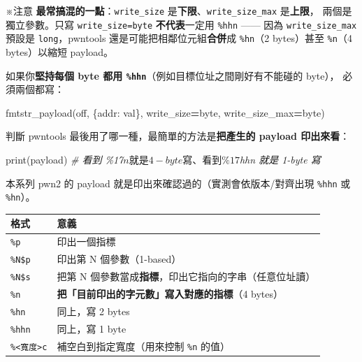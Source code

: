 \documentclass[10pt,a4paper]{article}
\newcounter{none}
\newenvironment{Shaded}{\begin{snugshade}}{\end{snugshade}}
\newcommand{\BuiltInTok}[1]{#1}
\newcommand{\CommentTok}[1]{\textcolor[rgb]{0.56,0.35,0.01}{\textit{#1}}}
\newcommand{\NormalTok}[1]{#1}
\newcommand{\OperatorTok}[1]{\textcolor[rgb]{0.81,0.36,0.00}{\textbf{#1}}}
\newcommand{\StringTok}[1]{\textcolor[rgb]{0.31,0.60,0.02}{#1}}
\renewenvironment{Shaded}{%
  \def\FrameCommand{\fboxsep=3.2pt\colorbox{shadecolor}}%
  \MakeFramed{\advance\hsize-\width\FrameRestore\small}%
}{%
  \endMakeFramed
}
\renewenvironment{quote}{%
  \begin{mdframed}[linewidth=0pt,innerleftmargin=0pt,innerrightmargin=0pt,
    innerbottommargin=0pt,innertopmargin=0pt,skipabove=0.55em,skipbelow=0.55em,
    leftmargin=0.9em,rightmargin=0.4em,startcode={\color{quotebar}\vrule width 2.6pt},%
    endcode={}]%
  \itshape\color{black}%
}{%
  \end{mdframed}%
}
\begin{document}
\begin{quote}
※注意 \textbf{最常搞混的一點}：\texttt{write\_\allowbreak{}size}
是\textbf{下限}、\texttt{write\_\allowbreak{}size\_\allowbreak{}max} 是\textbf{上限}，
兩個是獨立參數。只寫
\texttt{write\_\allowbreak{}size=\textquotesingle{}\allowbreak{}byte\textquotesingle{}\allowbreak{}}
\textbf{不代表}一定用 \texttt{\%\allowbreak{}hhn} ------ 因為
\texttt{write\_\allowbreak{}size\_\allowbreak{}max} 預設是
\texttt{\textquotesingle{}\allowbreak{}long\textquotesingle{}\allowbreak{}}，pwntools
還是可能把相鄰位元組\textbf{合併}成 \texttt{\%\allowbreak{}hn}（2 bytes）甚至
\texttt{\%\allowbreak{}n}（4 bytes）以縮短 payload。

如果你\textbf{堅持每個 byte 都用
\texttt{\%\allowbreak{}hhn}}（例如目標位址之間剛好有不能碰的 byte）， 必須兩個都寫：

\begin{Shaded}
\begin{Highlighting}[]
\NormalTok{fmtstr\_payload(off, \{addr: val\}, write\_size}\OperatorTok{=}\StringTok{\textquotesingle{}byte\textquotesingle{}}\NormalTok{, write\_size\_max}\OperatorTok{=}\StringTok{\textquotesingle{}byte\textquotesingle{}}\NormalTok{)}
\end{Highlighting}
\end{Shaded}

判斷 pwntools 最後用了哪一種，最簡單的方法是\textbf{把產生的 payload
印出來看}：

\begin{Shaded}
\begin{Highlighting}[]
\BuiltInTok{print}\NormalTok{(payload)      }\CommentTok{\# 看到 \%17$n 就是 4{-}byte 寫、看到 \%17$hhn 就是 1{-}byte 寫}
\end{Highlighting}
\end{Shaded}

本系列 pwn2 的 payload 就是印出來確認過的（實測會依版本/對齊出現
\texttt{\%\allowbreak{}hhn} 或 \texttt{\%\allowbreak{}hn}）。
\end{quote}

{\def\LTcaptype{none} %
\begin{longtable}[]{@{}ll@{}}
\toprule\noalign{}
格式 & 意義 \\
\midrule\noalign{}
\endhead
\bottomrule\noalign{}
\endlastfoot
\texttt{\%\allowbreak{}p} & 印出一個指標 \\
\texttt{\%\allowbreak{}N\$\allowbreak{}p} & 印出第 N 個參數（1-based） \\
\texttt{\%\allowbreak{}N\$\allowbreak{}s} & 把第 N
個參數當成\textbf{指標}，印出它指向的字串（任意位址讀） \\
\texttt{\%\allowbreak{}n} & \textbf{把「目前印出的字元數」寫入對應的指標}（4
bytes） \\
\texttt{\%\allowbreak{}hn} & 同上，寫 2 bytes \\
\texttt{\%\allowbreak{}hhn} & 同上，寫 1 byte \\
\texttt{\%\allowbreak{}\textless{}\allowbreak{}寬度\textgreater{}\allowbreak{}c} & 補空白到指定寬度（用來控制
\texttt{\%\allowbreak{}n} 的值） \\
\end{longtable}
}
\end{document}
